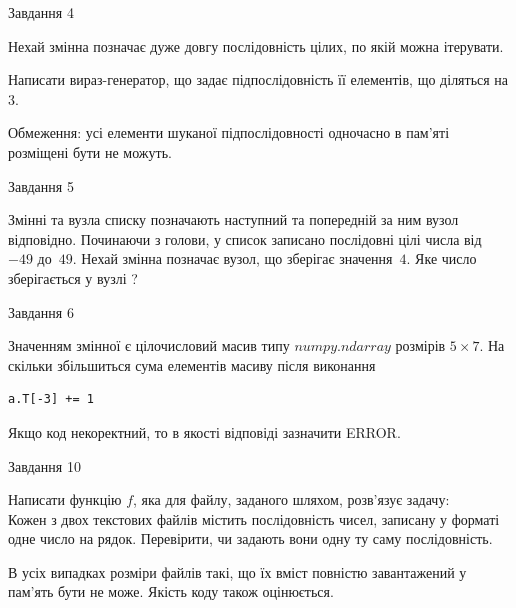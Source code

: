 \documentclass[12pt, ukrainian]{article}
\begin{document}
{               
{\begin{center}Завдання {4}\end{center}}
\vspace{-4mm}
Нехай змінна  позначає дуже довгу послідовність цілих, по якій можна ітерувати.

Написати вираз-генератор, що задає підпослідовність її елементів, що діляться на 3.

Обмеження: усі елементи шуканої підпослідовності одночасно в пам'яті розміщені бути не можуть.\par

\vspace{10mm}
               
{\begin{center}Завдання {5}\end{center}}
\vspace{-4mm}
Змінні  та  вузла списку позначають наступний та попередній за ним вузол відповідно. Починаючи з голови, у список записано послідовні цілі числа від~$-49$ до~$49$. Нехай змінна  позначає вузол, що зберігає значення~$4$.
Яке число зберігається у вузлі  ?\par

               
{\begin{center}Завдання {6}\end{center}}
\vspace{-4mm}
Значенням змінної  є цілочисловий масив типу $numpy.ndarray$ розмірів $5{\times}7$. На скільки збільшиться сума елементів масиву  після виконання
\begin{verbatim}
a.T[-3] += 1
\end{verbatim}


Якщо код некоректний, то в якості відповіді зазначити ERROR.\par

               
{\begin{center}Завдання {10}\end{center}}
\vspace{-4mm}

Написати функцію $f$, яка для файлу, заданого шляхом, розв’язує задачу:\\ Кожен з двох текстових файлів містить послідовність чисел, записану у форматі одне число на рядок.  Перевірити, чи задають вони одну ту саму послідовність.

В усіх випадках розміри файлів такі, що їх вміст повністю завантажений у пам'ять бути не може. Якість коду також оцінюється.



}
\end{document}
